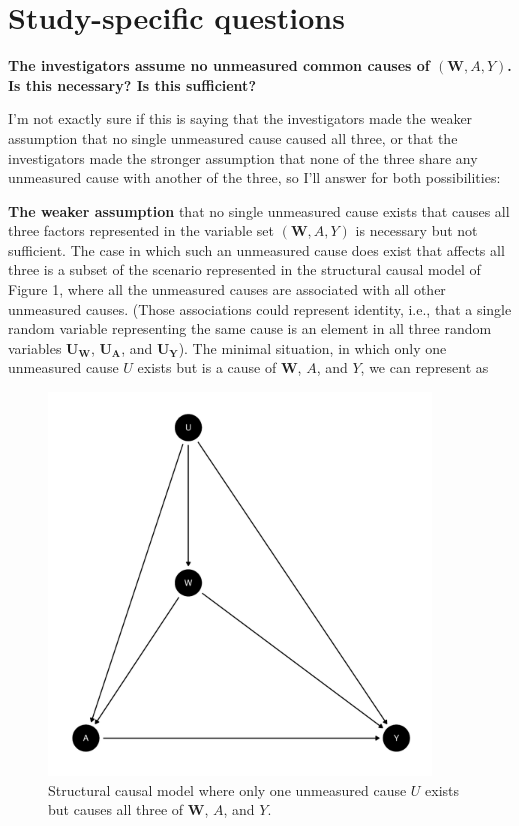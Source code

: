 \documentclass{article}\usepackage[]{graphicx}\usepackage[]{xcolor}
\newenvironment{knitrout}{}{} %
\begin{document}
\setlength{\leftskip}{0cm}

\section{Study-specific questions}

\setlength{\leftskip}{0.8cm}

\textbf{The investigators assume no unmeasured common causes of $(\bm{W}, A, Y)$. Is this necessary? Is this sufficient?} 

I'm not exactly sure if this is saying that the investigators made the weaker assumption that no single unmeasured cause caused all three, or that the investigators made the stronger assumption that none of the three share any unmeasured cause with another of the three, so I'll answer for both possibilities:

\vspace{2mm}

\textbf{The weaker assumption} that no single unmeasured cause exists that causes all three factors represented in the variable set $(\bm{W}, A, Y)$ is necessary but not sufficient. The case in which such an unmeasured cause does exist that affects all three is a subset of the scenario represented in the structural causal model of Figure 1, where all the unmeasured causes are associated with all other unmeasured causes. (Those associations could represent identity, i.e., that a single random variable representing the same cause is an element in all three random variables $\bm{U_W}$, $\bm{U_A}$, and $\bm{U_Y}$). The minimal situation, in which only one unmeasured cause $U$ exists but is a cause of $\bm{W}$, $A$, and $Y$, we can represent as

\begin{figure}[H]
  \caption{Structural causal model where only one unmeasured cause $U$ exists but causes all three of $\bm{W}$, $A$, and $Y$.}
      
\begin{knitrout}
\color{fgcolor}
\includegraphics[width=4in]{figure/unnamed-chunk-6-1} 

\end{knitrout}

\end{figure}
\end{document}
